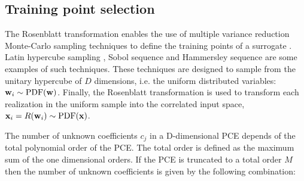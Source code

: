 \documentclass[preprint,12pt]{elsarticle}
\begin{document}


\subsection{Training point selection}

The Rosenblatt transformation enables the use of multiple variance reduction Monte-Carlo sampling techniques to define the training points of a surrogate \cite{feinberg2015chaospy}. Latin hypercube sampling \cite{mckay2000comparison}, Sobol sequence \cite{sobol1967distribution} and Hammersley sequence \cite{hammersley1960monte} are some examples of such techniques. These techniques are designed to sample from the unitary hypercube of $D$ dimensions, i.e. the uniform distributed variables: $\mathbf{w}_i \sim \mathrm{PDF}(\mathbf{w})$. Finally, the Rosenblatt transformation is used to transform each realization in the uniform sample into the correlated input space, $\mathbf{x}_i = R(\mathbf{w}_i) \sim \mathrm{PDF}(\mathbf{x})$.

The number of unknown coefficients $c_j$ in a D-dimensional PCE depends of the total polynomial order of the PCE. The total order is defined as the maximum sum of the one dimensional orders. If the PCE is truncated to a total order $M$ then the number of unknown coefficients is given by the following combination:

\end{document}
